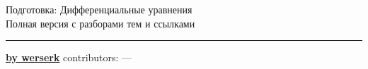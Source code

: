 \documentclass[11pt,a4paper]{article}
\newcommand{\topicsBase}{cheatsheets/math/differential-equations/preparation/topics}
\begin{document}
\begin{center}
  {\Huge Подготовка: Дифференциальные уравнения}\\[0.4cm]
  {\large Полная версия с разборами тем и ссылками}\\[0.2cm]
  \rule{\textwidth}{0.6pt}
\end{center}



% 
% 

\providecommand{\contributors}{}
\newcommand{\contributorsDisplay}{%
  \if\relax\detokenize{\contributors}\relax
    ---
  \else
    \texttt{\contributors}
  \fi}

{\noindent \href{https://werserk.com}{\textcolor{accent}{\textbf{by werserk}}} \hfill contributors: \contributorsDisplay}
\end{document}
